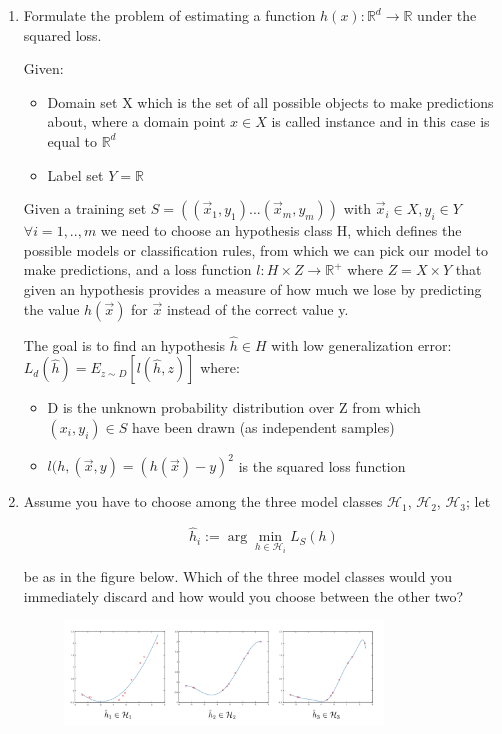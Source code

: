 \documentclass[a4paper,11pt,oneside]{book}
\begin{document}
\begin{enumerate}
\item Formulate the problem of estimating a function $h(x): \mathbb{R}^d \to \mathbb{R}$ under the squared loss.
    \begin{solution}
        Given:
        \begin{itemize}
        \item Domain set X which is the set of all possible objects to make predictions about, where a domain point $x \in X$ is called instance and in this case is equal to $\mathbb{R}^d$
        
        \item Label set $Y = \mathbb{R}$
        \end{itemize}
        
        Given a training set $S = ((\vec{x}_1,y_1) ... (\vec{x}_m,y_m))$ with $\vec{x}_i \in X, y_i \in Y$ $\forall i = 1,..,m$ we need to choose an hypothesis class H, which defines the possible models or classification rules, from which we can pick our model to make predictions, and a loss function $l: H\times Z \to \mathbb{R}^+$ where $Z = X\times Y$ that given an hypothesis provides a measure of how much we lose by predicting the value $h(\vec{x})$ for $\vec{x}$ instead of the correct value y.
        
        The goal is to find an hypothesis $\hat{h} \in H$ with low generalization error: $L_d(\hat{h}) = E_{z\sim D}[l(\hat{h},z)]$ where:
        
        \begin{itemize}
        \item D is the unknown probability distribution over Z from which $(x_i,y_i) \in S$ have been drawn (as independent samples)
        \item $l(h,(\vec{x},y) = (h(\vec{x})-y)^2$ is the squared loss function
        \end{itemize}
    \end{solution}
\item Assume you have to choose among the three model classes $\mathcal{H}_1$, $\mathcal{H}_2$, $\mathcal{H}_3$; let

    $$\hat{h}_i := \arg\min_{h\in\mathcal{H}_i} L_S(h)$$

    be as in the figure below. Which of the three model classes would you immediately discard and how would you choose between the other two?

    \begin{figure}[H]
    \centering
    \includegraphics[width=0.8\textwidth,height=0.4\textheight,keepaspectratio]{images/2_4_Sept_2019.png}
    \end{figure}


\end{enumerate}
\end{document}
